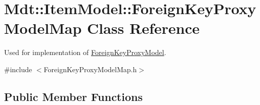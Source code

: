\hypertarget{class_mdt_1_1_item_model_1_1_foreign_key_proxy_model_map}{}\section{Mdt\+:\+:Item\+Model\+:\+:Foreign\+Key\+Proxy\+Model\+Map Class Reference}
\label{class_mdt_1_1_item_model_1_1_foreign_key_proxy_model_map}


Used for implementation of \hyperlink{class_mdt_1_1_item_model_1_1_foreign_key_proxy_model}{Foreign\+Key\+Proxy\+Model}.  




{\ttfamily \#include $<$Foreign\+Key\+Proxy\+Model\+Map.\+h$>$}

\subsection*{Public Member Functions}
